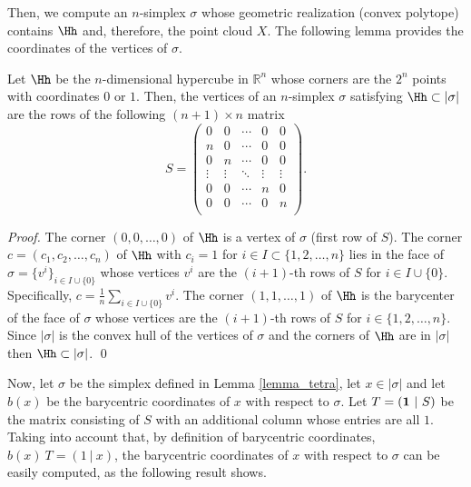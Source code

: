 Then, we compute an $n$-simplex $\sigma$ whose geometric realization (convex polytope) contains $\Hh$ and, therefore, the point cloud $X$.
The following lemma provides the coordinates of the vertices of $\sigma$.

\begin{lemma}\label{lemma_tetra}
Let $\Hh$ be the $n$-dimensional hypercube in $\mathbb{R}^n$
whose corners are the $2^n$  points with coordinates $0$ or $1$.
Then, the vertices of an $n$-simplex $\sigma$ satisfying $\Hh\subset |\sigma|$ are
the rows of the following $(n+1)\times n$ matrix
$$S=\begin{pmatrix}
0&0&\cdots&0& 0\\
n&0&\cdots&0& 0\\
0&n&\cdots& 0&0\\
\vdots&\vdots&\ddots&\vdots&\vdots\\
0&0&\cdots& n&0\\
0&0&\cdots& 0&n\\
\end{pmatrix}.$$ 
\end{lemma}
\begin{proof} 
The corner $(0,0,\dots,0)$ of $\Hh$ is a vertex of $\sigma$ (first row of $S$). The corner $c=(c_1,c_2,\dots,c_n)$ of $\Hh$ with
$c_i=1$ for $i\in I\subset \{1,2,\dots,n\}$
lies in the face of $\sigma=\{v^i\}_{i\in I\cup\{0\}}$ whose vertices $v^i$ are 
 the $(i+1)$-th rows  of $S$ for $i\in I\cup\{0\}$. Specifically, $c=\frac{1}{n}\sum_{i\in I\cup\{0\}}v^i$.
The corner $(1,1,\dots,1)$ of $\Hh$ 
is the barycenter of the face of $\sigma$ whose vertices are the $(i+1)$-th rows of $S$ for $i\in \{1,2,\dots,n\}$.
Since $|\sigma|$ is the convex hull of the vertices of $\sigma$ and the corners of $\Hh$ are in $|\sigma|$ 
then $\Hh\subset |\sigma|$. 
\qed  
\end{proof}

Now, let $\sigma$ be the simplex defined in Lemma \ref{lemma_tetra}, let $x\in |\sigma |$ and let $b(x)$ be
the barycentric coordinates of $x$ with respect to $\sigma$. Let $T=({\bf 1}\ |\ S)$ be the matrix consisting of $S$ with an additional column whose entries are all $1$.
Taking into account that, by definition of barycentric coordinates,
$b(x)  \ T =(1 \ | \ x)$, 
the barycentric coordinates of $x$ with respect to $\sigma$ can be easily computed, as the following result shows. 


